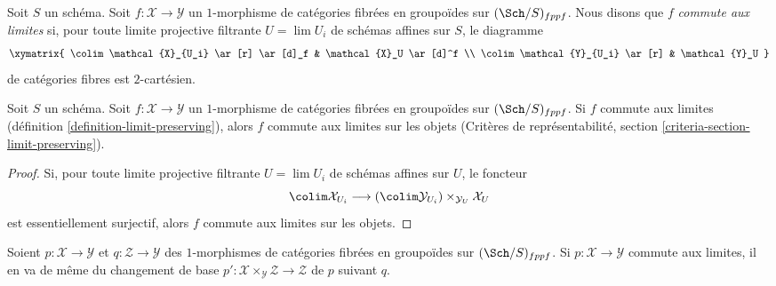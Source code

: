 \begin{definition}
\label{definition-limit-preserving}
Soit $S$ un schéma. Soit $f : \mathcal{X} \to \mathcal{Y}$ un
$1$-morphisme de catégories fibrées en groupoïdes sur $(\Sch/S)_{fppf}$.
Nous disons que $f$ {\it commute aux limites} si, pour toute limite projective
filtrante $U = \lim U_i$ de schémas affines sur $S$, le diagramme
$$
\xymatrix{
\colim \mathcal{X}_{U_i} \ar[r] \ar[d]_f & \mathcal{X}_U \ar[d]^f \\
\colim \mathcal{Y}_{U_i} \ar[r] & \mathcal{Y}_U
}
$$
de catégories fibres est $2$-cartésien.
\end{definition}

\begin{lemma}
\label{lemma-limit-preserving-objects}
Soit $S$ un schéma. Soit $f : \mathcal{X} \to \mathcal{Y}$ un
$1$-morphisme de catégories fibrées en groupoïdes sur $(\Sch/S)_{fppf}$.
Si $f$ commute aux limites (définition \ref{definition-limit-preserving}),
alors $f$ commute aux limites sur les objets (Critères de représentabilité,
section \ref{criteria-section-limit-preserving}).
\end{lemma}

\begin{proof}
Si, pour toute limite projective filtrante $U = \lim U_i$ de schémas affines
sur $U$, le foncteur
$$
\colim \mathcal{X}_{U_i} \longrightarrow
(\colim \mathcal{Y}_{U_i}) \times_{\mathcal{Y}_U} \mathcal{X}_U
$$
est essentiellement surjectif, alors $f$ commute aux limites sur les objets.
\end{proof}

\begin{lemma}
\label{lemma-base-change-limit-preserving}
Soient $p : \mathcal{X} \to \mathcal{Y}$ et
$q : \mathcal{Z} \to \mathcal{Y}$ des $1$-morphismes de catégories fibrées
en groupoïdes sur $(\Sch/S)_{fppf}$. Si
$p : \mathcal{X} \to \mathcal{Y}$ commute aux limites, il en va de même du
changement de base
$p' : \mathcal{X} \times_\mathcal{Y} \mathcal{Z} \to \mathcal{Z}$
de $p$ suivant $q$.
\end{lemma}

